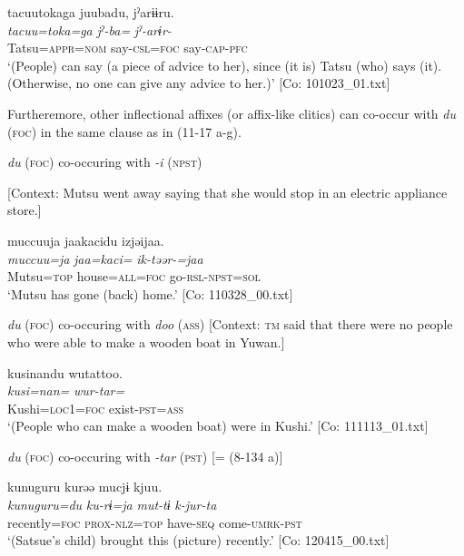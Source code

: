   \ex  
      \glll    tacuu{\textbar}toka{\textbar}ga  juubadu,  jˀarɨɨru.\\
      \textit{tacuu=toka=ga}  \textit{jˀ-ba=}  \textit{jˀ-arɨr-}\\
      Tatsu=\textsc{appr}=\textsc{nom}  say-\textsc{csl}=\textsc{foc}  say-\textsc{cap}-\textsc{pfc}\\
      \glt       ‘(People) can say (a piece of advice to her), since (it is) Tatsu (who) says (it). (Otherwise, no one can give any advice to her.)’ [Co: 101023\_01.txt]
\z
\z

  Furtheremore, other inflectional affixes (or affix-like clitics) can co-occur with \textit{du} (\textsc{foc}) in the same clause as in (11-17 a-g).

\ea\label{ex:11-17}  \ea \textit{du} (\textsc{foc}) co-occuring with \textit{{}-i} (\textsc{npst})

  [Context: Mutsu went away saying that she would stop in an electric appliance store.]

  
      \glll    muccuuja  jaakacidu  izjəijaa.\\
    \textit{muccuu=ja}  \textit{jaa=kaci=}  \textit{ik-təər-=jaa}\\
    Mutsu=\textsc{top}  house=\textsc{all}=\textsc{foc}  go-\textsc{rsl}-\textsc{npst}=\textsc{sol}\\
\glt     ‘Mutsu has gone (back) home.’ [Co: 110328\_00.txt]

  \ex \textit{du} (\textsc{foc}) co-occuring with \textit{doo} (\textsc{ass})
  [Context: \textsc{tm} said that there were no people who were able to make a wooden boat in Yuwan.]
  
      \glll    kusinandu  wutattoo.\\
    \textit{kusi=nan=}  \textit{wur-tar=}\\
    Kushi=\textsc{loc}1=\textsc{foc}  exist-\textsc{pst}=\textsc{ass}\\
\glt     ‘(People who can make a wooden boat) were in Kushi.’ [Co: 111113\_01.txt]

  \ex \textit{du} (\textsc{foc}) co-occuring with \textit{{}-tar} (\textsc{pst}) [= (8-134 a)]
  
      \glll    kunuguru  kurəə  mucjɨ\footnotemark[1]{}  kjuu.\\
    \textit{kunuguru=du}  \textit{ku-rɨ=ja}  \textit{mut-tɨ}  \textit{k-jur-ta}\\
    recently=\textsc{foc}  \textsc{prox}-\textsc{nlz}=\textsc{top}  have-\textsc{seq}  come-\textsc{umrk}-\textsc{pst}\\
\glt     ‘(Satsue’s child) brought this (picture) recently.’ [Co: 120415\_00.txt]

